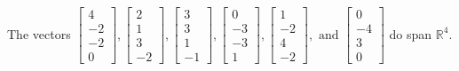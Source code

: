 \begin{exercise}
\begin{exerciseStatement}
  \end{exerciseStatement}
  \begin{exerciseAnswer}
   The vectors \(\left[\begin{array}{r}
4 \\
-2 \\
-2 \\
0
\end{array}\right] , \left[\begin{array}{r}
2 \\
1 \\
3 \\
-2
\end{array}\right] , \left[\begin{array}{r}
3 \\
3 \\
1 \\
-1
\end{array}\right] , \left[\begin{array}{r}
0 \\
-3 \\
-3 \\
1
\end{array}\right] , \left[\begin{array}{r}
1 \\
-2 \\
4 \\
-2
\end{array}\right] , \text{ and } \left[\begin{array}{r}
0 \\
-4 \\
3 \\
0
\end{array}\right]\) 
  	 do  
	span \(\mathbb{R}^4\).
  


  \end{exerciseAnswer}
\end{exercise}